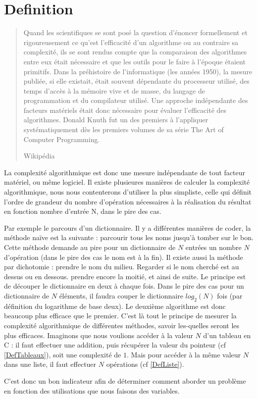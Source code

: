 \label{DefComplexite}
\section{Definition}
  \begin{quotation}
    Quand les scientifiques se sont posé la question d'énoncer formellement et rigoureusement ce qu'est l'efficacité d'un algorithme ou au contraire sa complexité, ils se sont rendus compte que la comparaison des algorithmes entre eux était nécessaire et que les outils pour le faire à l'époque étaient primitifs. Dans la préhistoire de l'informatique (les années 1950), la mesure publiée, si elle existait, était souvent dépendante du processeur utilisé, des temps d'accès à la mémoire vive et de masse, du langage de programmation et du compilateur utilisé.
Une approche indépendante des facteurs matériels était donc nécessaire pour évaluer l'efficacité des algorithmes. Donald Knuth fut un des premiers à l'appliquer systématiquement dès les premiers volumes de sa série The Art of Computer Programming. 
    \begin{flushright}
      Wikipédia
    \end{flushright}
  \end{quotation}
  
  La complexité algorithmique est donc une mesure indépendante de tout facteur matériel, ou même logiciel.
  Il existe plusieures manières de calculer la complexité algorithmique, nous nous contenterons d'utiliser la plus 
  simpliste, celle qui définit l'ordre de grandeur du nombre d'opération nécessaires à la réalisation du résultat en 
  fonction nombre d'entrée N, dans le pire des cas.
  
  Par exemple le parcours d'un dictionnaire. Il y a différentes manières de coder, la méthode naïve est la suivante : parcourir tous les noms jusqu'à tomber sur le bon. Cette méthode demande au pire pour un dictionnaire de $N$ entrées un nombre $N$ d'opération (dans le pire des cas le nom est à la fin).
  Il existe aussi la méthode par dichotomie : prendre le nom du milieu. Regarder si le nom cherché est au dessus ou en dessous.
  prendre encore la moitié, et ainsi de suite. Le principe est de découper le dictionnaire en deux à chaque fois. Dans le pire des cas pour un dictionnaire de $N$ éléments, il faudra couper le dictionnaire $log_2(N)$ fois (par définition du logarithme de base deux).
  Le deuxième algorithme est donc beaucoup plus efficace que le premier. C'est là tout le principe de mesurer la complexité algorithmique de différentes méthodes, savoir les-quelles seront les plus efficaces.
    Imaginons que nous voulions accéder à la valeur $N$ d'un tableau en C : il faut effectuer une addition, puis récupérer la valeur du pointeur (cf \ref{DefTableaux}), soit une complexité de $1$.
    Mais pour accéder à la même valeur $N$ dans une liste, il faut effectuer $N$ opérations (cf \ref{DefListe}).
    
    C'est donc un bon indicateur afin de déterminer comment aborder un problème en fonction des utilisations que nous faisons des variables. 
